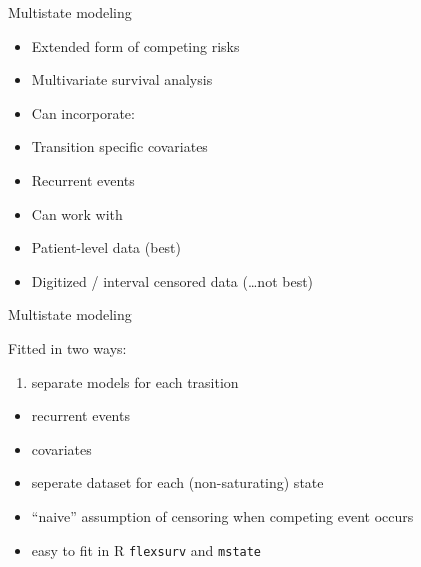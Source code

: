 \documentclass[ignorenonframetext,]{beamer}
\providecommand{\tightlist}{%
  \setlength{\itemsep}{0pt}\setlength{\parskip}{0pt}}
\begin{document}
\begin{frame}{Multistate modeling}

\begin{itemize}
\item
  Extended form of competing risks
\item
  Multivariate survival analysis
\item
  Can incorporate:
\item
  Transition specific covariates
\item
  Recurrent events
\item
  Can work with
\item
  Patient-level data (best)
\item
  Digitized / interval censored data (\ldots{}not best)
\end{itemize}

\end{frame}

\begin{frame}[fragile]{Multistate modeling}

Fitted in two ways:

\begin{enumerate}
\def\labelenumi{\arabic{enumi}.}
\tightlist
\item
  separate models for each trasition
\end{enumerate}

\begin{itemize}
\tightlist
\item
  recurrent events
\item
  covariates
\item
  seperate dataset for each (non-saturating) state
\item
  ``naive'' assumption of censoring when competing event occurs
\item
  easy to fit in R \texttt{flexsurv} and \texttt{mstate}
\end{itemize}

\end{frame}
\end{document}
